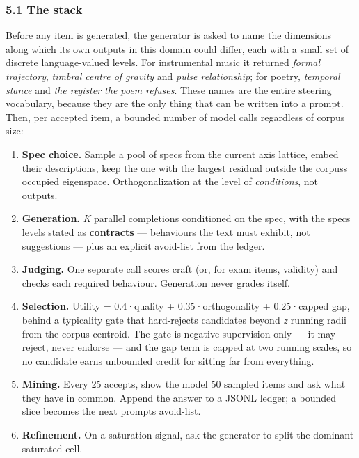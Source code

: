 \documentclass[
  10pt,
]{article}
\providecommand{\tightlist}{%
  \setlength{\itemsep}{0pt}\setlength{\parskip}{0pt}}
\theoremstyle{plain}
\theoremstyle{definition}
\providecommand{\tightlist}{\setlength{\itemsep}{0pt}\setlength{\parskip}{0pt}}
\begin{document}
\subsubsection{5.1 The stack}\label{51-the-stack}

Before any item is generated, the generator is asked to name the
dimensions along which its own outputs in this domain could differ, each
with a small set of discrete language-valued levels. For instrumental
music it returned \emph{formal trajectory}, \emph{timbral centre of
gravity} and \emph{pulse relationship}; for poetry, \emph{temporal
stance} and \emph{the register the poem refuses}. These names are the
entire steering vocabulary, because they are the only thing that can be
written into a prompt. Then, per accepted item, a bounded number of
model calls regardless of corpus size:

\begin{enumerate}
\def\labelenumi{\arabic{enumi}.}
\tightlist
\item
  \textbf{Spec choice.} Sample a pool of specs from the current axis
  lattice, embed their descriptions, keep the one with the largest
  residual outside the corpus\textquotesingle s occupied eigenspace.
  Orthogonalization at the level of \emph{conditions}, not outputs.
\item
  \textbf{Generation.} \emph{K} parallel completions conditioned on the
  spec, with the spec\textquotesingle s levels stated as
  \textbf{contracts} --- behaviours the text must exhibit, not
  suggestions --- plus an explicit avoid-list from the ledger.
\item
  \textbf{Judging.} One separate call scores craft (or, for exam items,
  validity) and checks each required behaviour. Generation never grades
  itself.
\item
  \textbf{Selection.} Utility = 0.4·quality + 0.35·orthogonality +
  0.25·capped gap, behind a typicality gate that hard-rejects candidates
  beyond \emph{z} running radii from the corpus centroid. The gate is
  negative supervision only --- it may reject, never endorse --- and the
  gap term is capped at two running scales, so no candidate earns
  unbounded credit for sitting far from everything.
\item
  \textbf{Mining.} Every 25 accepts, show the model 50 sampled items and
  ask what they have in common. Append the answer to a JSONL ledger; a
  bounded slice becomes the next prompts\textquotesingle{} avoid-list.
\item
  \textbf{Refinement.} On a saturation signal, ask the generator to
  split the dominant saturated cell.
\end{enumerate}
\end{document}
